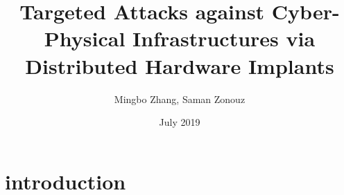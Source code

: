 \documentclass[sigconf]{acmart}
\title{Targeted Attacks against Cyber-Physical Infrastructures via Distributed Hardware Implants}
\author{Mingbo Zhang, Saman Zonouz}
\date{July 2019}
\begin{document}
\maketitle


%
\section{introduction}



%


%



 
\end{document}
